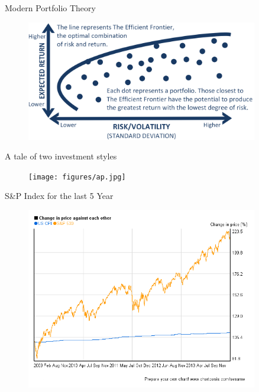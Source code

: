 \documentclass[handout]{beamer}
\begin{document}
\begin{frame}{Modern Portfolio Theory}
  \begin{figure}
    \centering
    \includegraphics[width = 0.9\textwidth]{figures/mpt.png}
  \end{figure}
\end{frame}

\begin{frame}{A tale of two investment styles}
  \begin{figure}
    \centering
    \texttt{[image: figures/ap.jpg]}
  \end{figure}
\end{frame}

\begin{frame}{S\&P Index for the last 5 Year}

  \begin{figure}
    \centering
    \includegraphics[width = 0.9\textwidth]{figures/snp500.png}
  \end{figure}

\end{frame}
\end{document}
